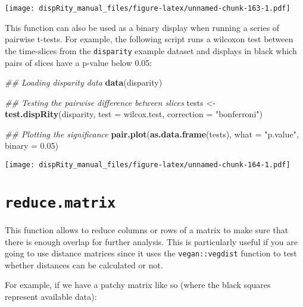 \documentclass[
]{book}
\newenvironment{Shaded}{\begin{snugshade}}{\end{snugshade}}
\newcommand{\CommentTok}[1]{\textcolor[rgb]{0.56,0.35,0.01}{\textit{#1}}}
\newcommand{\DataTypeTok}[1]{\textcolor[rgb]{0.13,0.29,0.53}{#1}}
\newcommand{\FloatTok}[1]{\textcolor[rgb]{0.00,0.00,0.81}{#1}}
\newcommand{\KeywordTok}[1]{\textcolor[rgb]{0.13,0.29,0.53}{\textbf{#1}}}
\newcommand{\NormalTok}[1]{#1}
\newcommand{\StringTok}[1]{\textcolor[rgb]{0.31,0.60,0.02}{#1}}
\begin{document}
\texttt{[image: dispRity\_manual\_files/figure-latex/unnamed-chunk-163-1.pdf]}

This function can also be used as a binary display when running a series of pairwise t-tests.
For example, the following script runs a wilcoxon test between the time-slices from the \texttt{disparity} example dataset and displays in black which pairs of slices have a p-value below 0.05:

\begin{Shaded}
\begin{Highlighting}[]
\CommentTok{\#\# Loading disparity data}
\KeywordTok{data}\NormalTok{(disparity)}

\CommentTok{\#\# Testing the pairwise difference between slices}
\NormalTok{tests \textless{}{-}}\StringTok{ }\KeywordTok{test.dispRity}\NormalTok{(disparity, }\DataTypeTok{test =}\NormalTok{ wilcox.test, }\DataTypeTok{correction =} \StringTok{"bonferroni"}\NormalTok{)}

\CommentTok{\#\# Plotting the significance}
\KeywordTok{pair.plot}\NormalTok{(}\KeywordTok{as.data.frame}\NormalTok{(tests), }\DataTypeTok{what =} \StringTok{"p.value"}\NormalTok{, }\DataTypeTok{binary =} \FloatTok{0.05}\NormalTok{)}
\end{Highlighting}
\end{Shaded}

\texttt{[image: dispRity\_manual\_files/figure-latex/unnamed-chunk-164-1.pdf]}

\hypertarget{reduce.matrix}{%
\section{\texorpdfstring{\texttt{reduce.matrix}}{reduce.matrix}}\label{reduce.matrix}}

This function allows to reduce columns or rows of a matrix to make sure that there is enough overlap for further analysis.
This is particularly useful if you are going to use distance matrices since it uses the \texttt{vegan::vegdist} function to test whether distances can be calculated or not.

For example, if we have a patchy matrix like so (where the black squares represent available data):
\end{document}
